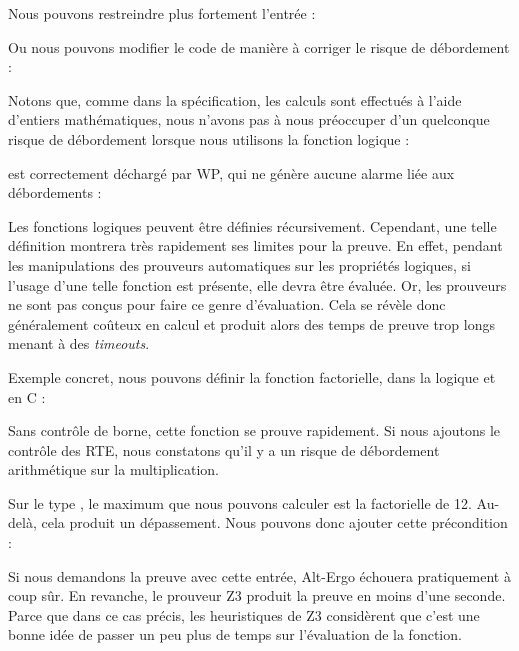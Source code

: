 Nous pouvons restreindre plus fortement l'entrée :




Ou nous pouvons modifier le code de manière à corriger le risque
de débordement :




Notons que, comme dans la spécification, les calculs sont effectués à l'aide
d'entiers mathématiques, nous n'avons pas à nous préoccuper d'un quelconque
risque de débordement lorsque nous utilisons la fonction logique  :




est correctement déchargé par WP, qui ne génère aucune alarme liée aux
débordements :






Les fonctions logiques peuvent être définies récursivement. Cependant, une telle
définition montrera très rapidement ses limites pour la preuve. En effet,
pendant les manipulations des prouveurs automatiques sur les propriétés
logiques, si l'usage d'une telle fonction est présente, elle devra être évaluée.
Or, les prouveurs ne sont pas conçus pour faire ce genre d'évaluation. Cela se
révèle donc généralement coûteux en calcul et produit alors des temps de preuve
trop longs menant à des \textit{timeouts}.



Exemple concret, nous pouvons définir la fonction factorielle, dans la logique
et en C :






Sans contrôle de borne, cette fonction se prouve rapidement. Si nous ajoutons
le contrôle des RTE, nous constatons qu'il y a un risque de débordement
arithmétique sur la multiplication.



Sur le type , le maximum que nous pouvons calculer est la factorielle de
12. Au-delà, cela produit un dépassement. Nous pouvons donc ajouter cette
précondition :






Si nous demandons la preuve avec cette entrée, Alt-Ergo échouera pratiquement à
coup sûr. En revanche, le prouveur Z3 produit la preuve en moins d'une seconde.
Parce que dans ce cas précis, les heuristiques de Z3 considèrent que c'est une
bonne idée de passer un peu plus de temps sur l'évaluation de la fonction.



